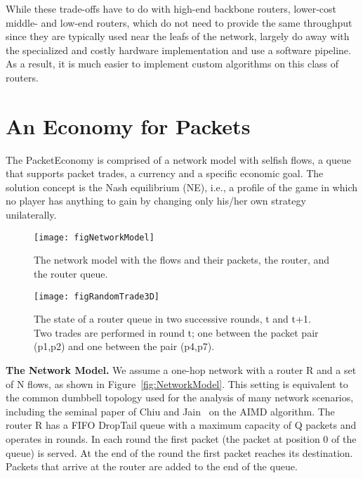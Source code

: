 \documentclass[letterpaper,10pt]{llncs}
\begin{document}
While these trade-offs have to do with high-end backbone routers, lower-cost middle- and low-end routers, which do not need to provide the same throughput since they are typically used near the leafs of the network, largely do away with the specialized and costly hardware implementation and use a software pipeline. As a result, it is much easier to implement custom algorithms on this class of routers.

 
\section{An Economy for Packets}
\label{sec:EconomyForPackets}
The PacketEconomy is comprised of a network model with selfish flows,
a queue that supports packet trades, a currency and a specific economic goal.
The solution concept is the Nash equilibrium (NE), i.e., 
a profile of the game in which no player has anything to gain by changing only his/her own strategy unilaterally.

\begin{figure}[h!]
\begin{minipage}[b]{0.38\linewidth}
\centering
\texttt{[image: figNetworkModel]}
\caption{The network model with the flows and their packets, the router, and the router queue.\\}
\label{fig:NetworkModel}
\end{minipage}
\hspace{0.2cm}
\begin{minipage}[b]{0.55\linewidth}
\centering
\texttt{[image: figRandomTrade3D]}
\caption{The state of a router queue in two successive rounds, t and t+1. Two trades are performed in round t; 
one between the packet pair (p1,p2) and one between the pair (p4,p7).}
\label{fig:SimpleTrade}
\end{minipage}
\end{figure}

\textbf{The Network Model.}
We assume a one-hop network with a router R and a set of N flows, as shown in Figure~\ref{fig:NetworkModel}.
This setting is equivalent to the common dumbbell topology used for the analysis of many network scenarios,
including the seminal paper of Chiu and Jain~\cite{CJ89} on the AIMD algorithm.
The router R has a FIFO DropTail queue with a maximum capacity of Q packets and operates in rounds.
In each round the first packet (the packet at position 0 of the queue) is served.
At the end of the round the first packet reaches its destination.
Packets that arrive at the router are added to the end of the queue.
\end{document}

